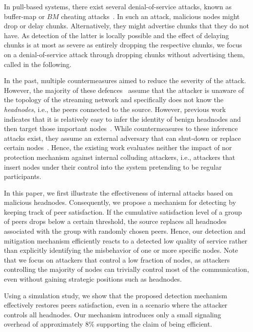 In pull-based systems, there exist several denial-of-service attacks, known as buffer-map or $BM$ cheating attacks~\cite{cheatingAnalysis}. 
In such an attack, malicious nodes might drop or delay chunks. Alternatively, they might advertise chunks that they do not have. As detection of the latter is locally possible and the effect of delaying chunks is at most as severe as entirely dropping the respective chunks, we focus on a denial-of-service attack through dropping chunks without advertising them, called \drop in the following.  


In the past, multiple countermeasures aimed to reduce the severity of the \drop attack. However, the majority of these defences~\cite{zhang2005coolstreaming, defending2, antiliar} assume that the attacker is unaware of the topology of the streaming network and specifically does not know the \emph{headnodes}, i.e., the peers connected to the source. 
However, previous work indicates that it is relatively easy to infer the identity of benign headnodes and then target those important nodes~\cite{nguyen2016swap}.
While countermeasures to these inference attacks exist, they assume an external adversary that can shut-down or replace certain nodes~\cite{nguyen2016swap, rbcs, nguyen2014resilience}. 
Hence, the existing work evaluates neither the impact of nor protection mechanism against internal colluding attackers, i.e., attackers that insert nodes under their control into the system pretending to be regular participants. 


In this paper, we first illustrate the effectiveness of internal attacks based on malicious headnodes. 
Consequently, we propose a mechanism for detecting \drop by keeping track of peer satisfaction. If the cumulative satisfaction level of a group of peers drops below a certain threshold, the source replaces all headnodes associated with the group with randomly chosen peers. 
Hence, our detection and mitigation mechanism efficiently reacts to a detected low quality of service  rather than explicitly identifying the misbehavior of one or more specific nodes.
Note that we focus on attackers that control a low fraction of nodes, as attackers controlling the majority of nodes can trivially control most of the communication, even without gaining strategic positions such as headnodes.    

Using a simulation study, we show that the proposed detection mechanism effectively restores peers satisfaction, even in a scenario where the attacker controls all headnodes. 
Our mechanism introduces only a small signaling overhead of approximately $8\%$ supporting the claim of being efficient.

